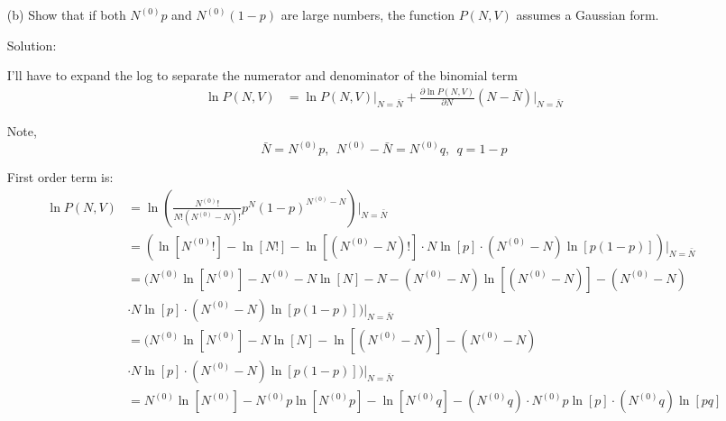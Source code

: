 \begin{homeworkProblem}
\begin{itemize}
\begin{callout}{Solution:}
                And the RMS is 
                $$\sqrt{\mu_{2}} = \sqrt{N^{(0)}p(1-p)}$$


            \end{callout}
            \newpage
        \item[(b)] Show that if both $N^{(0)} p$ and $N^{(0)}(1-p)$ are large numbers, the function $P(N, V)$ assumes a Gaussian form.
            \begin{callout}{Solution:}

                I'll have to expand the log to separate the numerator and denominator of the binomial term
                \begin{align*}
                    \ln P(N,V) &= \ln P(N, V)\Bigg|_{N=\bar{N}} 
                    + \frac{\partial \ln P(N,V)}{\partial N} (N-\bar{N})\Bigg|_{N=\bar{N}}
                \end{align*}

                Note, $$\bar N = N^{(0)}p,\ \ N^{(0)}-\bar N = N^{(0)}q,\ \ q = 1-p$$

First order term is:
\begin{align*}
    \ln P(N,V)&= \ln \left(\frac{N^{(0)}!}{N!(N^{(0)}-N)!}p^{N}(1-p)^{N^{(0)}-N}\right)\Bigg|_{N=\bar{N}} \\ 
              &= \left( \ln[N^{(0)}!]-\ln[N!]-\ln[(N^{(0)}-N)!] \cdot N\ln [p] \cdot (N^{(0)}-N) \ln [p(1-p)] \right)\Bigg|_{N=\bar{N}} \\ 
              &= \Big( N^{(0)}\ln[N^{(0)}] - N^{(0)} - N\ln[N] - N -(N^{(0)}-N)\ln[(N^{(0)}-N)] - (N^{(0)}-N)\\& \cdot N\ln [p] \cdot (N^{(0)}-N) \ln [p(1-p)] \Big)\Bigg|_{N=\bar{N}} \\
              &= \Big( N^{(0)}\ln[N^{(0)}]- N\ln[N] - \ln[(N^{(0)}-N)] - (N^{(0)}-N) \\ & \cdot N\ln [p] \cdot (N^{(0)}-N) \ln [p(1-p)] \Big)\Bigg|_{N=\bar{N}} \\
              &= N^{(0)}\ln[N^{(0)}]- N^{(0)}p\ln[N^{(0)}p] - \ln[N^{(0)}q] - (N^{(0)}q) \cdot N^{(0)}p\ln [p] \cdot (N^{(0)}q) \ln [pq]
\end{align*}


\end{callout}
\end{itemize}
\end{homeworkProblem}
